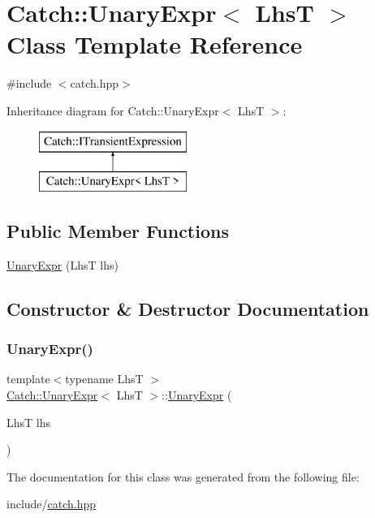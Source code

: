 \hypertarget{classCatch_1_1UnaryExpr}{}\section{Catch\+:\+:Unary\+Expr$<$ LhsT $>$ Class Template Reference}
\label{classCatch_1_1UnaryExpr}


{\ttfamily \#include $<$catch.\+hpp$>$}

Inheritance diagram for Catch\+:\+:Unary\+Expr$<$ LhsT $>$\+:\begin{figure}[H]
\begin{center}
\leavevmode
\includegraphics[height=2.000000cm]{classCatch_1_1UnaryExpr}
\end{center}
\end{figure}
\subsection*{Public Member Functions}
\begin{DoxyCompactItemize}
\item 
\mbox{\hyperlink{classCatch_1_1UnaryExpr_ae02f666a1e64da728628aa2033e1d6e7}{Unary\+Expr}} (LhsT lhs)
\end{DoxyCompactItemize}


\subsection{Constructor \& Destructor Documentation}
\mbox{\label{classCatch_1_1UnaryExpr_ae02f666a1e64da728628aa2033e1d6e7}} 
\subsubsection{\texorpdfstring{Unary\+Expr()}{UnaryExpr()}}
{\footnotesize\ttfamily template$<$typename LhsT $>$ \\
\mbox{\hyperlink{classCatch_1_1UnaryExpr}{Catch\+::\+Unary\+Expr}}$<$ LhsT $>$\+::\mbox{\hyperlink{classCatch_1_1UnaryExpr}{Unary\+Expr}} (\begin{DoxyParamCaption}\item[{LhsT}]{lhs }\end{DoxyParamCaption})\hspace{0.3cm}{\ttfamily [inline]}}



The documentation for this class was generated from the following file\+:\begin{DoxyCompactItemize}
\item 
include/\mbox{\hyperlink{catch_8hpp}{catch.\+hpp}}\end{DoxyCompactItemize}
